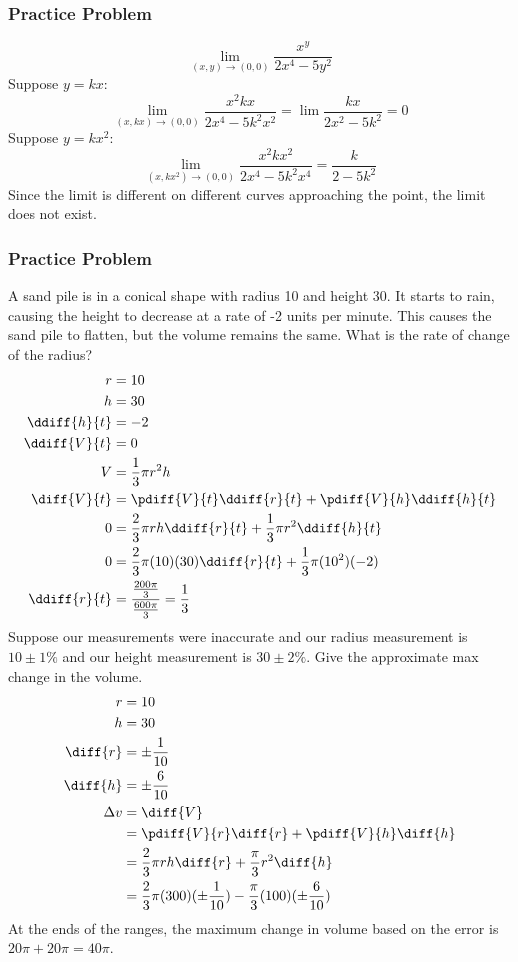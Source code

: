 \documentclass[letterpaper, 12pt]{math}
\begin{document}
\subsubsection*{Practice Problem}
\[ \lim_{(x,y)\to(0,0)}\frac{x^y}{2x^4-5y^2} \]
Suppose \( y = kx \):
\[ \lim_{(x,kx)\to(0,0)}\frac{x^2kx}{2x^4-5k^2x^2} =
  \lim\frac{kx}{2x^2-5k^2} = 0 \]
Suppose \( y = kx^2 \):
\[ \lim_{(x,kx^2)\to(0,0)}\frac{x^2kx^2}{2x^4-5k^2x^4} =
  \frac{k}{2-5k^2} \]
Since the limit is different on different curves approaching the point, the
limit does not exist.

\subsubsection*{Practice Problem}
A sand pile is in a conical shape with radius 10 and height 30. It starts to
rain, causing the height to decrease at a rate of -2 units per minute. This
causes the sand pile to flatten, but the volume remains the same. What is the
rate of change of the radius?
\begin{align*}
  r &= 10 \\
  h &= 30 \\
  \ddiff{h}{t} &= -2 \\
  \ddiff{V}{t} &= 0 \\
  V &= \frac{1}{3}\pi r^2h \\
  \diff{V}{t} &= \pdiff{V}{t}\ddiff{r}{t}+\pdiff{V}{h}\ddiff{h}{t} \\
  0 &= \frac{2}{3}\pi rh\ddiff{r}{t}+\frac{1}{3}\pi r^2\ddiff{h}{t} \\
  0 &= \frac{2}{3}\pi(10)(30)\ddiff{r}{t}+\frac{1}{3}\pi(10^2)(-2) \\
  \ddiff{r}{t} &= \frac{\frac{200\pi}{3}}{\frac{600\pi}{3}} = \frac{1}{3}
\end{align*}
Suppose our measurements were inaccurate and our radius measurement is
\( 10\pm1\% \) and our height measurement is \( 30\pm2\% \). Give the
approximate max change in the volume.
\begin{align*}
  r &= 10 \\
  h &= 30 \\
  \diff{r} &= \pm\frac{1}{10} \\
  \diff{h} &= \pm\frac{6}{10} \\
  \Delta{v} &= \diff{V} \\
  &= \pdiff{V}{r}\diff{r}+\pdiff{V}{h}\diff{h} \\
  &= \frac{2}{3}\pi rh\diff{r}+\frac{\pi}{3}r^2\diff{h} \\
  &= \frac{2}{3}\pi(300)(\pm\frac{1}{10})-\frac{\pi}{3}(100)(\pm\frac{6}{10}) \\
\end{align*}
At the ends of the ranges, the maximum change in volume based on the error is
\( 20\pi+20\pi = 40\pi \).
\end{document}
